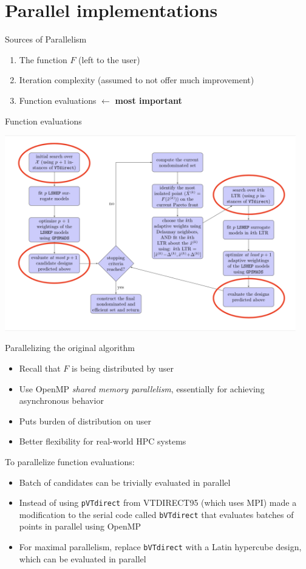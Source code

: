 \documentclass[xcolor=dvipsnames]{beamer}
\begin{document}
\section{Parallel implementations}
\begin{frame}{Sources of Parallelism}
\begin{enumerate}
\item The function $F$ (left to the user)
\item Iteration complexity (assumed to not offer much improvement)
\item Function evaluations $\leftarrow$ {\bf most important}
\end{enumerate}
\end{frame}
\begin{frame}{Function evaluations}
\begin{center}
\includegraphics[width=0.95\textwidth]{eval-chart.png}
\end{center}
\end{frame}
\begin{frame}{Parallelizing the original algorithm}
\begin{itemize}
\item Recall that $F$ is being distributed by user
\item Use OpenMP {\it shared memory parallelism}, essentially for achieving
asynchronous behavior
\item Puts burden of distribution on user
\item Better flexibility for real-world HPC systems
\end{itemize}
\medskip\pause
To parallelize function evaluations:
\begin{itemize}
\item Batch of candidates can be trivially evaluated in parallel
\item Instead of using {\tt pVTdirect} from VTDIRECT95 (which uses MPI)
made a modification to the serial code called {\tt bVTdirect} that evaluates
batches of points in parallel using OpenMP
\item For maximal parallelism, replace {\tt bVTdirect} with a Latin hypercube
design, which can be evaluated in parallel
\end{itemize}
\end{frame}
\end{document}
